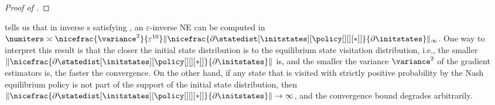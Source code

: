 \begin{proof}[Proof of ]
\end{proof}

 tells us that in inverse s satisfying , an $\varepsilon$-inverse NE can be computed in $\numiters \asymp \nicefrac{\variance^2}{ \varepsilon^{10}} \|\nicefrac{\partial\statedist[\initstates][{\policy[][][*]}]}{\partial \initstates} \|_\infty$.
One way to interpret this result is that the closer the initial state distribution is to the equilibrium state visitation distribution, i.e., the smaller $\left\|\nicefrac{\partial\statedist[\initstates][{\policy[][][*]}]}{\partial \initstates} \right\|$ is, and the smaller the variance $\variance^2$ of the gradient estimators is, the faster the convergence.
On the other hand, if any state that is visited with strictly positive probability by the Nash equilibrium policy is not part of the support of the initial state distribution, then $\left\|\nicefrac{\partial\statedist[\initstates][{\policy[][][*]}]}{\partial \initstates} \right\| \to \infty$, and the convergence bound degrades arbitrarily.


\thminversesimulacrum*

